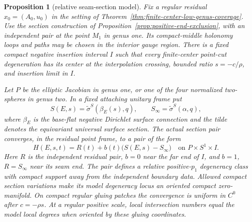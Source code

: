 \documentclass[11pt]{amsart}
\newtheorem{proposition}[theorem]{Proposition}
\theoremstyle{definition}
\theoremstyle{remark}
\theoremstyle{plain}
\begin{document}
\begin{proposition}[relative seam-section model]
\label{prop:relative-seam-model}
Fix a regular residual $x_0=(A_0,u_0)$ in the setting of
Theorem~\ref{thm:finite-center-low-genus-coverage}.
Use the section construction of
Proposition~\ref{prop:positive-end-exclusion}, with an independent
pair at the point $M_1$ in genus one. Its compact-middle holonomy
loops and paths may be chosen in the interior gauge region.
There is a fixed compact negative insertion interval $I$ such
that every finite-center point-cut degeneration has its center
at the interpolation crossing, bounded ratio $s=-c/\rho$,
and insertion limit in $I$.

Let $P$ be the elliptic Jacobian in genus one, or one of the
four normalized two-spheres in genus two. In a fixed attaching
unitary frame put
\begin{equation}\label{eq:relative-seam-pair}
 S(E,s)=\widetilde\sigma^S(\beta_E(s),q),\qquad
 S_\infty=\widetilde\sigma^S(\alpha,q),
\end{equation}
where $\beta_E$ is the base-flat negative Dirichlet surface
connection and the tilde denotes the equivariant universal
surface section. The actual section pair converges, in the
residual point frame, to a pair of the form
\begin{equation}\label{eq:relative-local-pair}
 H(E,s,t)=R(t)+b(t)\bigl(S(E,s)-S_\infty\bigr)
                 \quad\text{on }P\times S^1\times I.
\end{equation}
Here $R$ is the independent residual pair, $b=0$ near the
far end of $I$, and $b=1$, $R=S_\infty$ near its seam end.
The pair defines a relative positive-$p_1$ degeneracy class
with compact support away from the independent boundary data.
Allowed compact section variations make its model degeneracy
locus an oriented compact zero-manifold.
On compact regular gluing patches the convergence is uniform
in $C^0$ after $c=-\rho s$. At a regular positive scale,
local intersection numbers equal the model local degrees
when oriented by these gluing coordinates.
\end{proposition}
\end{document}
